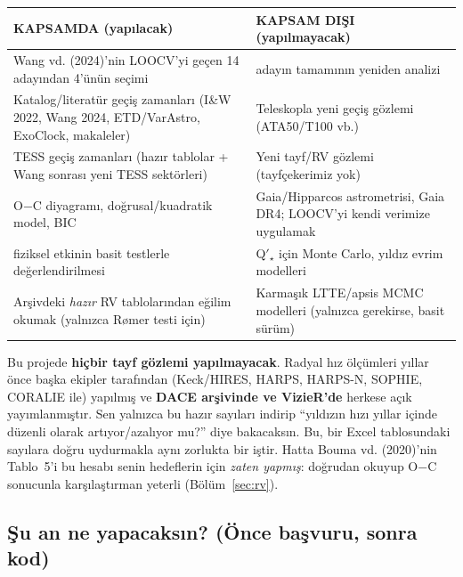 \documentclass[11pt,a4paper]{article}
\begin{document}
\begin{center}
\begin{tabularx}{\textwidth}{>{\raggedright\arraybackslash}X >{\raggedright\arraybackslash}X}
\toprule
\textbf{KAPSAMDA (yapılacak)} & \textbf{KAPSAM DIŞI (yapılmayacak)}\\
\midrule
Wang vd. (2024)'nin LOOCV'yi geçen 14 adayından 4'ünün seçimi & 26 adayın tamamının yeniden analizi\\
Katalog/literatür geçiş zamanları (I\&W 2022, Wang 2024, ETD/VarAstro, ExoClock, makaleler) & Teleskopla yeni geçiş gözlemi (ATA50/T100 vb.)\\
TESS geçiş zamanları (hazır tablolar + Wang sonrası yeni TESS sektörleri) & Yeni tayf/RV gözlemi (tayfçekerimiz yok)\\
O$-$C diyagramı, doğrusal/kuadratik model, BIC & Gaia/Hipparcos astrometrisi, Gaia DR4; LOOCV'yi kendi verimize uygulamak\\
6 fiziksel etkinin basit testlerle değerlendirilmesi & Q$'_\star$ için Monte Carlo, yıldız evrim modelleri\\
Arşivdeki \emph{hazır} RV tablolarından eğilim okumak (yalnızca Rømer testi için) & Karmaşık LTTE/apsis MCMC modelleri (yalnızca gerekirse, basit sürüm)\\
\bottomrule
\end{tabularx}
\end{center}

\begin{dikkat}
Bu projede \textbf{hiçbir tayf gözlemi yapılmayacak}. Radyal hız ölçümleri yıllar önce başka ekipler tarafından
(Keck/HIRES, HARPS, HARPS-N, SOPHIE, CORALIE ile) yapılmış ve \textbf{DACE arşivinde ve VizieR'de} herkese açık yayımlanmıştır.
Sen yalnızca bu hazır sayıları indirip “yıldızın hızı yıllar içinde düzenli olarak artıyor/azalıyor mu?” diye
bakacaksın. Bu, bir Excel tablosundaki sayılara doğru uydurmakla aynı zorlukta bir iştir. Hatta Bouma vd.
(2020)'nin Tablo~5'i bu hesabı senin hedeflerin için \emph{zaten yapmış}: doğrudan okuyup O$-$C sonucunla
karşılaştırman yeterli (Bölüm~\ref{sec:rv}).
\end{dikkat}

\subsection{Şu an ne yapacaksın? (Önce başvuru, sonra kod)}
\end{document}

